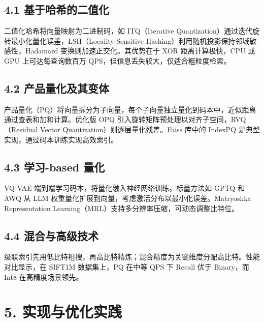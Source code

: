 \section{4.1 基于哈希的二值化}
二值化哈希将向量映射为二进制码，如 ITQ（Iterative Quantization）通过迭代旋转最小化量化误差，LSH（Locality-Sensitive Hashing）利用随机投影保持邻域敏感性，Hadamard 变换则加速正交化。其优势在于 XOR 距离计算极快，CPU 或 GPU 上可达每查询数百万 QPS，但信息丢失较大，仅适合粗粒度检索。\par
\section{4.2 产品量化及其变体}
产品量化（PQ）将向量拆分为子向量，每个子向量独立量化到码本中，近似距离通过查表和加和计算。优化版 OPQ 引入旋转矩阵预处理以对齐子空间，RVQ（Residual Vector Quantization）则逐层量化残差。Faiss 库中的 IndexPQ 是典型实现，通过码本训练实现高效索引。\par
\section{4.3 学习-based 量化}
VQ-VAE 端到端学习码本，将量化融入神经网络训练。标量方法如 GPTQ 和 AWQ 从 LLM 权重量化扩展到向量，考虑激活分布以最小化误差。Matryoshka Representation Learning（MRL）支持多分辨率压缩，可动态调整比特位。\par
\section{4.4 混合与高级技术}
级联索引先用低比特粗搜，再高比特精炼；混合精度为关键维度分配高比特。性能对比显示，在 SIFT1M 数据集上，PQ 在中等 QPS 下 Recall 优于 Binary，而 Int8 在高精度场景领先。\par
\chapter{5. 实现与优化实践}
